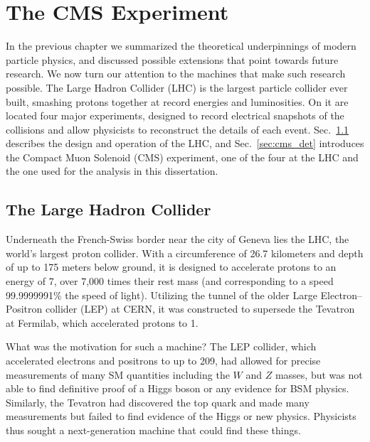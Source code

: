 \chapter{The CMS Experiment}

In the previous chapter we summarized the theoretical underpinnings of modern
particle physics, and discussed possible extensions that point towards
future research. We now turn our attention to the machines that make such
research possible. The Large Hadron Collider (LHC) is the largest
particle collider ever built, smashing protons together at record energies and luminosities.
On it are located four major experiments, designed to record electrical
snapshots of the collisions and allow physicists to reconstruct the details
of each event. Sec.~\ref{sec:lhc} describes the design and operation of the LHC,
and Sec.~\ref{sec:cms_det} introduces the Compact Muon Solenoid (CMS) experiment,
one of the four at the LHC and the one used for the analysis in this dissertation.

\section{The Large Hadron Collider}
\label{sec:lhc}

Underneath the French-Swiss border near the city of Geneva lies the LHC, the world's largest 
proton collider. With a circumference of 26.7 kilometers and depth of up to 175
meters below ground, it is designed to accelerate protons to an energy of 7\TeV, over
7,000 times their rest mass (and corresponding to a speed 
99.9999991\% the speed of light). Utilizing the tunnel of the older Large Electron--Positron
collider (LEP) at CERN, it was constructed to supersede the Tevatron at Fermilab, which
accelerated protons to 1\TeV.

What was the motivation for such a machine? The LEP collider, which accelerated electrons
and positrons to up to 209\GeV, had allowed for precise measurements of many SM quantities
including the $W$ and $Z$ masses, but was not able to find definitive proof of a Higgs boson
or any evidence for BSM physics. Similarly, the Tevatron had discovered the top quark
and made many measurements but failed to find evidence of the Higgs or new physics. Physicists
thus sought a next-generation machine that could find these things.

